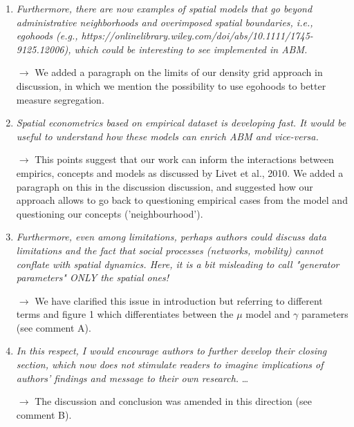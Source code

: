 \documentclass[11pt,a4paper,sans]{moderncv}        %
\begin{document}
\begin{enumerate}
  \medskip

  \item \textit{Furthermore, there are now examples of spatial models that go beyond administrative neighborhoods and overimposed spatial boundaries, i.e., egohoods (e.g., https://onlinelibrary.wiley.com/doi/abs/10.1111/1745-9125.12006), which could be interesting to see implemented in ABM.}
  
  $\rightarrow$ We added a paragraph on the limits of our density grid approach in discussion, in which we mention the possibility to use egohoods to better measure segregation.
  
  \medskip
  
   \item \textit{Spatial econometrics based on empirical dataset is developing fast. It would be useful to understand how these models can enrich ABM and vice-versa.}
   
     $\rightarrow$ This points suggest that our work can inform the interactions between empirics, concepts and models as discussed by Livet et al., 2010. We added a paragraph on this in the discussion discussion, and suggested how our approach allows to go back to questioning empirical cases from the model and questioning our concepts ('neighbourhood').

  \medskip

  \item\textit{Furthermore, even among limitations, perhaps authors could discuss data limitations and the fact that social processes (networks, mobility) cannot conflate with spatial dynamics. Here, it is a bit misleading to call "generator parameters" ONLY the spatial ones!}
  
  $\rightarrow$ We have clarified this issue in introduction but referring to different terms and figure 1 which differentiates between the $\mu$ model and $\gamma$ parameters (see comment A).
 
 \medskip
 
 
  \item\textit{In this respect, I would encourage authors to further develop their closing section, which now does not stimulate readers to imagine implications of authors' findings and message to their own research.} \ldots
  
  $\rightarrow$ The discussion and conclusion was amended in this direction (see comment B).


\end{enumerate}






\end{document}
